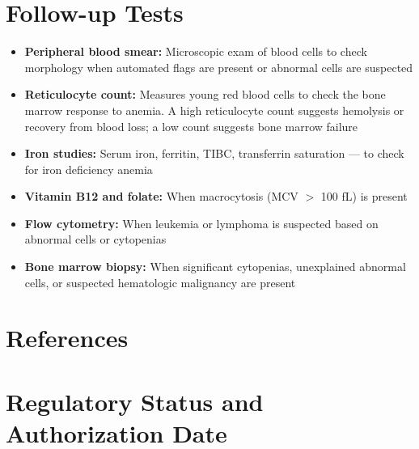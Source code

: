 \section*{Follow-up Tests}
\begin{itemize}
  \item \textbf{Peripheral blood smear:} Microscopic exam of blood cells to check morphology when automated flags are present or abnormal cells are suspected
  \item \textbf{Reticulocyte count:} Measures young red blood cells to check the bone marrow response to anemia. A high reticulocyte count suggests hemolysis or recovery from blood loss; a low count suggests bone marrow failure
  \item \textbf{Iron studies:} Serum iron, ferritin, TIBC, transferrin saturation --- to check for iron deficiency anemia
  \item \textbf{Vitamin B12 and folate:} When macrocytosis (MCV $>$ 100 fL) is present
  \item \textbf{Flow cytometry:} When leukemia or lymphoma is suspected based on abnormal cells or cytopenias
  \item \textbf{Bone marrow biopsy:} When significant cytopenias, unexplained abnormal cells, or suspected hematologic malignancy are present
\end{itemize}


\section*{References}



\clearpage
\section*{Regulatory Status and Authorization Date}

\clearpage
